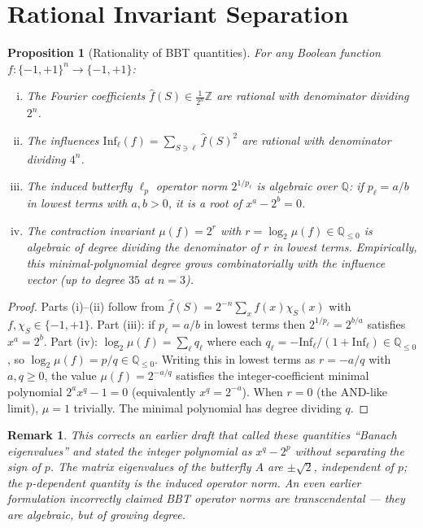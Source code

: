 \documentclass[11pt]{article}
\newtheorem{proposition}[theorem]{Proposition}
\newtheorem{remark}[theorem]{Remark}
\newcommand{\Z}{\mathbb{Z}}
\newcommand{\Inf}{\mathrm{Inf}}
\begin{document}
\section{Rational Invariant Separation}
\label{sec:rational}

\begin{proposition}[Rationality of BBT quantities]
\label{prop:rational}
For any Boolean function $f:\{-1,+1\}^n \to \{-1,+1\}$:
\begin{enumerate}[(i)]
    \item The Fourier coefficients $\hat{f}(S) \in \frac{1}{2^n}\Z$ are rational with denominator dividing $2^n$.
    \item The influences $\Inf_\ell(f) = \sum_{S \ni \ell} \hat{f}(S)^2$ are rational with denominator dividing $4^n$.
    \item The induced butterfly $\ell_p$ operator norm $2^{1/p_\ell}$ is algebraic over $\mathbb{Q}$: if $p_\ell = a/b$ in lowest terms with $a, b > 0$, it is a root of $x^a - 2^b = 0$.
    \item The contraction invariant $\mu(f) = 2^r$ with $r = \log_2 \mu(f) \in \mathbb{Q}_{\le 0}$ is algebraic of degree dividing the denominator of $r$ in lowest terms. Empirically, this minimal-polynomial degree grows combinatorially with the influence vector (up to degree $35$ at $n=3$).
\end{enumerate}
\end{proposition}

\begin{proof}
Parts (i)--(ii) follow from $\hat{f}(S) = 2^{-n} \sum_x f(x) \chi_S(x)$ with $f, \chi_S \in \{-1, +1\}$. Part (iii): if $p_\ell = a/b$ in lowest terms then $2^{1/p_\ell} = 2^{b/a}$ satisfies $x^a = 2^b$. Part (iv): $\log_2 \mu(f) = \sum_\ell q_\ell$ where each $q_\ell = -\Inf_\ell/(1+\Inf_\ell) \in \mathbb{Q}_{\le 0}$, so $\log_2 \mu(f) = p/q \in \mathbb{Q}_{\le 0}$. Writing this in lowest terms as $r = -a/q$ with $a, q \ge 0$, the value $\mu(f) = 2^{-a/q}$ satisfies the integer-coefficient minimal polynomial $2^{a} x^q - 1 = 0$ (equivalently $x^q = 2^{-a}$). When $r = 0$ (the AND-like limit), $\mu = 1$ trivially. The minimal polynomial has degree dividing $q$.
\end{proof}

\begin{remark}
This corrects an earlier draft that called these quantities ``Banach eigenvalues'' and stated the integer polynomial as $x^q - 2^p$ without separating the sign of $p$. The matrix eigenvalues of the butterfly $A$ are $\pm \sqrt{2}$, independent of $p$; the $p$-dependent quantity is the induced operator norm. An even earlier formulation incorrectly claimed BBT operator norms are transcendental --- they are algebraic, but of growing degree.
\end{remark}
\end{document}
